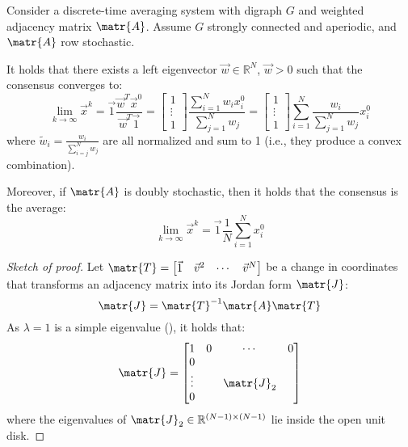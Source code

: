 \begin{theorem} 
    Consider a discrete-time averaging system with digraph $G$ and weighted adjacency matrix $\matr{A}$. Assume $G$ strongly connected and aperiodic, and $\matr{A}$ row stochastic. 
    
    It holds that there exists a left eigenvector $\vec{w} \in \mathbb{R}^N$, $\vec{w} > 0$ such that the consensus converges to:
        \[ 
            \lim_{k \rightarrow \infty} \vec{x}^k 
            = \vec{1}\frac{\vec{w}^T \vec{x}^0}{\vec{w}^T\vec{1}} 
            = \begin{bmatrix} 1 \\ \vdots \\ 1 \end{bmatrix} \frac{\sum_{i=1}^N w_i x_i^0}{\sum_{j=1}^N w_j}
            = \begin{bmatrix} 1 \\ \vdots \\ 1 \end{bmatrix} \sum_{i=1}^N \frac{w_i}{\sum_{j=1}^N w_j} x_i^0
        \]
        where $\tilde{w}_i = \frac{w_i}{\sum_{i=j}^N w_j}$ are all normalized and sum to 1 (i.e., they produce a convex combination).

    Moreover, if $\matr{A}$ is doubly stochastic, then it holds that the consensus is the average:
    \[ 
        \lim_{k \rightarrow \infty} \vec{x}^k = \vec{1} \frac{1}{N} \sum_{i=1}^N x_i^0
    \]

    \begin{proof}[Sketch of proof]
        Let $\matr{T} = \begin{bmatrix} \vec{1} & \vec{v}^2 & \cdots & \vec{v}^N \end{bmatrix}$ be a change in coordinates that transforms an adjacency matrix into its Jordan form $\matr{J}$:
        \[ \matr{J} = \matr{T}^{-1} \matr{A} \matr{T} \]
        As $\lambda=1$ is a simple eigenvalue (), it holds that:
        \[
            \matr{J} = \begin{bmatrix}
                1 & 0 & \cdots & 0 \\
                0 & & &  \\
                \vdots & & \matr{J}_2 &  \\
                0 & & &  \\
            \end{bmatrix}
        \]
        where the eigenvalues of $\matr{J}_2 \in \mathbb{R}^{(N-1) \times (N-1)}$ lie inside the open unit disk.


\end{proof}
\end{theorem}
